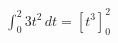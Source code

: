 \documentclass[preview]{standalone}
\begin{document}
\begin{align*}
\int_0^2 3t^2 \, dt = \left[ t^3 \right]_0^2
\end{align*}
\end{document}
